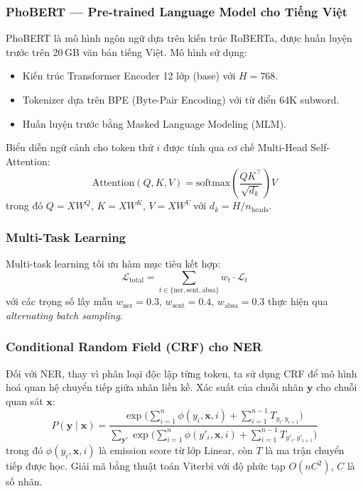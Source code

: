 \subsubsection{PhoBERT — Pre-trained Language Model cho Tiếng Việt}

PhoBERT \cite{phobert2020} là mô hình ngôn ngữ dựa trên kiến trúc RoBERTa,
được huấn luyện trước trên 20\,GB văn bản tiếng Việt. Mô hình sử dụng:
\begin{itemize}
    \item Kiến trúc Transformer Encoder 12 lớp (base) với $H = 768$.
    \item Tokenizer dựa trên BPE (Byte-Pair Encoding) với từ điển 64K subword.
    \item Huấn luyện trước bằng Masked Language Modeling (MLM).
\end{itemize}

Biểu diễn ngữ cảnh cho token thứ $i$ được tính qua cơ chế Multi-Head Self-Attention:
\begin{equation}
    \text{Attention}(Q, K, V) = \text{softmax}\!\left(\frac{QK^\top}{\sqrt{d_k}}\right) V
\end{equation}
trong đó $Q = XW^Q$, $K = XW^K$, $V = XW^V$ với $d_k = H / n_{\text{heads}}$.

\subsubsection{Multi-Task Learning}

Multi-task learning tối ưu hàm mục tiêu kết hợp:
\begin{equation}
    \mathcal{L}_{\text{total}} = \sum_{t \in \{\text{ner}, \text{sent}, \text{absa}\}} w_t \cdot \mathcal{L}_t
\end{equation}
với các trọng số lấy mẫu $w_{\text{ner}} = 0.3$, $w_{\text{sent}} = 0.4$, $w_{\text{absa}} = 0.3$
thực hiện qua \emph{alternating batch sampling}.

\subsubsection{Conditional Random Field (CRF) cho NER}

Đối với NER, thay vì phân loại độc lập từng token, ta sử dụng CRF
để mô hình hoá quan hệ chuyển tiếp giữa nhãn liền kề.
Xác suất của chuỗi nhãn $\mathbf{y}$ cho chuỗi quan sát $\mathbf{x}$:
\begin{equation}
    P(\mathbf{y} \mid \mathbf{x}) = \frac{
        \exp\!\bigl(\sum_{i=1}^{n} \phi(y_i, \mathbf{x}, i) + \sum_{i=1}^{n-1} T_{y_i, y_{i+1}}\bigr)
    }{
        \sum_{\mathbf{y}'} \exp\!\bigl(\sum_{i=1}^{n} \phi(y'_i, \mathbf{x}, i) + \sum_{i=1}^{n-1} T_{y'_i, y'_{i+1}}\bigr)
    }
\end{equation}
trong đó $\phi(y_i, \mathbf{x}, i)$ là emission score từ lớp Linear, còn $T$ là ma trận chuyển tiếp được học.
Giải mã bằng thuật toán Viterbi với độ phức tạp $O(nC^2)$, $C$ là số nhãn.


